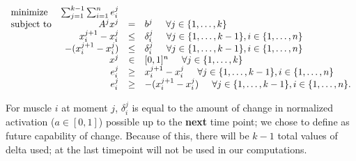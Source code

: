 \begin{equation}
\begin{array}{lrcl}
\mbox{minimize} & \sum_{j=1}^{k-1} \sum_{i=1}^n e_i^j \\ 
\mbox{subject to} & A^j x^j &=& b^j \hspace{5mm} \forall j \in \{1,\dots, k\} \\
  & x_i^{j+1} - x_i^{j} &\leq& \delta_i^j  \hspace{5mm} \forall j \in \{1,\dots, k-1\}, i \in \{1,\dots,n\} \\
  &  -(x_i^{j+1} - x_i^{j}) &\leq& \delta_i^j  \hspace{5mm} \forall j \in \{1,\dots, k-1\}, i \in \{1,\dots,n\} \\
  & x^j &\in& [0,1]^n \hspace{5mm} \forall j \in \{1,\dots, k\} \\
  & e_i^j &\geq& x_i^{j+1} - x_i^{j} \hspace{5mm} \forall j \in \{1,\dots, k-1\}, i \in \{1,\dots,n\}\\
  & e_i^j &\geq& -(x_i^{j+1} - x_i^{j}) \hspace{5mm} \forall j \in \{1,\dots, k-1\}, i \in \{1,\dots,n\}.
\end{array}
\end{equation}

For muscle $i$ at moment $j$, $\delta_i^j$ is equal to the amount of change in normalized activation ($a \in [0,1]$) possible up to the \textbf{next} time point; we chose to define \delta as future capability of change. Because of this, there will be $k-1$ total values of delta used; \delta at the last timepoint will not be used in our computations.
